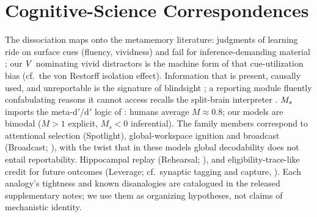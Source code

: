 \section{Cognitive-Science Correspondences}
\label{app:brain}
The dissociation maps onto the metamemory literature: judgments of learning ride
on surface cues (fluency, vividness) and fail for inference-demanding material
\citep{koriat1997,nelson1990}; our $V$ nominating vivid distractors is the
machine form of that cue-utilization bias (cf.\ the von Restorff isolation
effect). Information that is present, causally used, and unreportable is the
signature of blindsight \citep{weiskrantz1986}; a reporting module fluently
confabulating reasons it cannot access recalls the split-brain interpreter
\citep{gazzaniga2000}. $M_s$ imports the meta-d$'$/d$'$ logic of
\citet{fleming2014how}: humans average $M \approx 0.8$; our models are bimodal
($M{>}1$ explicit, $M_s{<}0$ inferential). The family members correspond to
attentional selection (Spotlight), global-workspace ignition and broadcast
(Broadcast; \citealp{dehaene2011}), with the twist that in these models global
decodability does not entail reportability. Hippocampal replay
(Rehearsal; \citealp{wilson1994}), and eligibility-trace-like credit for future
outcomes (Leverage; cf.\ synaptic tagging and capture, \citealp{frey1997}).
Each analogy's tightness and known disanalogies are catalogued in the released
supplementary notes; we use them as organizing hypotheses, not claims of
mechanistic identity.
